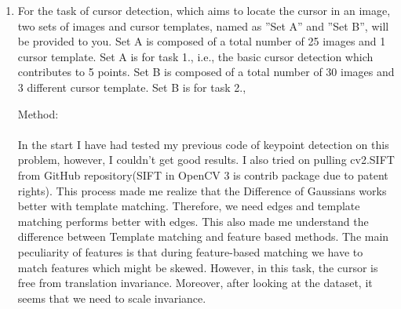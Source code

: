 \documentclass[12pt]{article}
\newenvironment{QandA}
{
	\begin{enumerate}[label=\normalfont\arabic*.,leftmargin=2em,rightmargin=2em]\normalfont
	}
	{
	\end{enumerate}
}
\newenvironment{answered}{\setlength{\parindent}{1em}\par\normalfont}{}
\begin{document}
\begin{QandA}
\begin{answered}
\begin{figure}
  			\caption{Detected Keypoints on Original Image}
  		\label{keypoint-result}
\end{figure}
I think there are too many key points detected which are not relevant, I can see that in the top right corner, the key points are arranged perfectly on the branch, However, during areas of flat regions such as sky where every point is either minimal or maxima we are having problems. Also, we haven't found subpixel key points. After doing these steps we could get a better result.
\\
The coordinates of the five left-most detected key points are(Format is (Height, Width) or (y,x)):
\\
(1,1),(1,24),(25,3),(4,28),(1,30)
\\
\\
Footnote:
\\
\\
I tried detecting the key points as well as I could. But I think that my convolution function is not quite right. I know the concept of keypoints detection and convolution, however, I was unable to implement it properly.
\end{answered}
		\item For the task of cursor detection, which aims to locate the cursor in an image, two sets of images and cursor templates, named as ”Set A” and ”Set B”, will be provided to you. Set A is composed of a total number of 25 images and 1 cursor template. Set A is for task 1., i.e., the basic cursor detection which contributes to 5 points. Set B is composed of a total number of 30 images and 3 different cursor template. Set B is for task 2.,
\begin{answered}
Method:
\\
\\
In the start I have had tested my previous code of keypoint detection on this problem, however, I couldn't get good results. I also tried on pulling cv2.SIFT from GitHub repository(SIFT in OpenCV 3 is contrib package due to patent rights). This process made me realize that the Difference of Gaussians works better with template matching. Therefore, we need edges and template matching performs better with edges. This also made me understand the difference between Template matching and feature based methods. The main peculiarity of features is that during feature-based matching we have to match features which might be skewed. However, in this task, the cursor is free from translation invariance. Moreover, after looking at the dataset, it seems that we need to scale invariance.

\end{answered}
\end{QandA}
\end{document}
